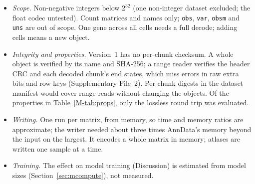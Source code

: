 \begin{itemize}
  allows (zstd is the library); order-0 rANS is a scalar four-state coder. The trend is an
  empirical fit extrapolated beyond the smallest code; leaving out any one code moves \sone's ratio between
   and \%.
\item \emph{Scope.} Non-negative integers below $2^{32}$ (one non-integer dataset excluded; the float codec untested).
  Count matrices and names only; \texttt{obs}, \texttt{var}, \texttt{obsm} and \texttt{uns} are out of scope. One gene
  across all cells needs a full decode; adding cells means a new object.
\item \emph{Integrity and properties.} Version~1 has no per-chunk checksum. A whole object is verified by its name and
  SHA-256; a range reader verifies the header CRC and each decoded chunk's end states, which miss errors in raw extra bits
  and row keys (Supplementary File~2). Per-chunk digests in the dataset manifest would cover range reads without changing
  the objects. Of the properties in Table~\ref{M-tab:props}, only the lossless round trip was evaluated.
\item \emph{Writing.} One run per matrix, from memory, so time and memory ratios are approximate; the \sone{} writer
  needed about three times AnnData's memory beyond the input on the largest. It encodes a whole matrix in memory; atlases
  are written one sample at a time.
\item \emph{Training.} The effect on model training (Discussion) is estimated from model sizes
  (Section~\ref{sec:mcompute}), not measured.
\end{itemize}
